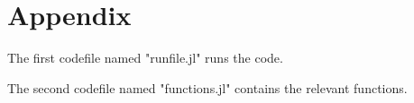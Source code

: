 \documentclass[landscape]{article} %
\theoremstyle{definition}
\begin{document}
\begin{enumerate}
%
%

\end{enumerate}
\newpage
\section*{Appendix}
 	The first codefile named "runfile.jl" runs the code.
	
 	The second codefile named "functions.jl" contains the relevant functions.
\end{document}
